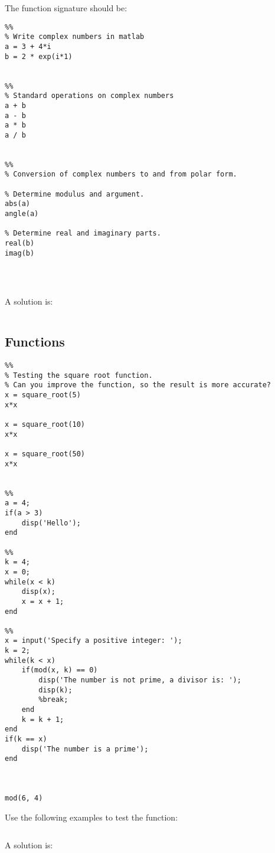 \begin{ex}
The function signature should be:
\begin{lstlisting}
%% 
% Write complex numbers in matlab
a = 3 + 4*i
b = 2 * exp(i*1)


%%
% Standard operations on complex numbers
a + b
a - b
a * b
a / b


%%
% Conversion of complex numbers to and from polar form.

% Determine modulus and argument.
abs(a)
angle(a)

% Determine real and imaginary parts.
real(b)
imag(b)




\end{lstlisting}
\begin{hint}
\end{hint}
\begin{sol}
A solution is:
\begin{lstlisting}
\end{lstlisting}
\end{sol}
\end{ex}

\subsection{Functions}

\begin{ex}
\begin{lstlisting}
%%
% Testing the square root function.
% Can you improve the function, so the result is more accurate?
x = square_root(5)
x*x

x = square_root(10)
x*x

x = square_root(50)
x*x


%%
a = 4;
if(a > 3)
    disp('Hello');
end

%%
k = 4;
x = 0;
while(x < k)
    disp(x);
    x = x + 1;
end

%%
x = input('Specify a positive integer: ');
k = 2;
while(k < x)
    if(mod(x, k) == 0)
        disp('The number is not prime, a divisor is: ');
        disp(k);
        %break;
    end
    k = k + 1;
end
if(k == x)
    disp('The number is a prime');
end



mod(6, 4)
\end{lstlisting}
Use the following examples to test the function:
\begin{lstlisting}
\end{lstlisting}
\begin{hint}
\end{hint}
\begin{sol}
A solution is:
\begin{lstlisting}
\end{lstlisting}
\end{sol}
\end{ex}


 